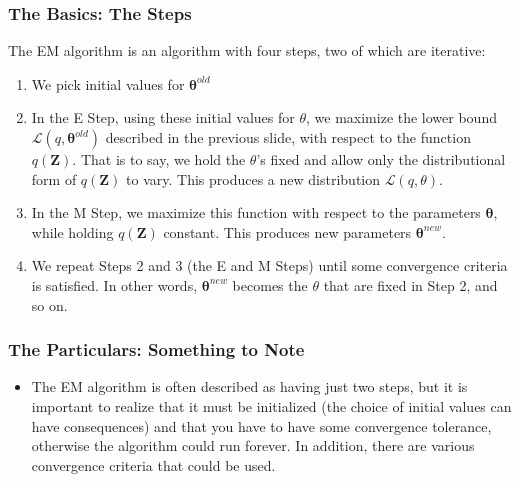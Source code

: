 \documentclass{beamer}
\begin{document}
\begin{frame}
\frametitle{The Basics: The Steps}
The EM algorithm is an algorithm with four steps, two of which are iterative:
	\begin{enumerate}
		\item We pick initial values for $\boldsymbol{\theta}^{old}$
		\item In the E Step, using these initial values for $\theta$, we maximize the lower bound $\mathcal{L}(q, \boldsymbol{\theta}^{old})$ described in the previous slide, with respect to the function $q(\mathbf{Z})$. That is to say, we hold the $\theta$'s fixed and allow only the distributional form of $q(\mathbf{Z})$ to vary. This produces a new distribution $\mathcal{L}(q, \theta)$. 
		\item In the M Step, we maximize this function with respect to the parameters $\boldsymbol{\theta}$, while holding $q(\mathbf{Z})$ constant. This produces new parameters $\boldsymbol{\theta}^{new}$.
		\item We repeat Steps 2 and 3 (the E and M Steps) until some convergence criteria is satisfied. In other words, $\boldsymbol{\theta}^{new}$ becomes the $\theta$ that are fixed in Step 2, and so on. 
	\end{enumerate}
\end{frame}

\begin{frame}
\frametitle{The Particulars: Something to Note}
	\begin{itemize}
		\item The EM algorithm is often described as having just two steps, but it is important to realize that it must be initialized (the choice of initial values can have consequences) and that you have to have some convergence tolerance, otherwise the algorithm could run forever. In addition, there are various convergence criteria that could be used.  
	\end{itemize}
\end{frame}
\end{document}
